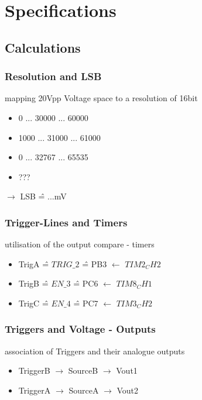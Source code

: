 	\section{Specifications}
	\subsection{Calculations}

	\subsubsection{Resolution and LSB}
	mapping 20Vpp Voltage space to a resolution of 16bit
	\begin{itemize}
		\item 0 ... 30000 ... 60000
		\item 1000 ... 31000 ... 61000
		\item 0 ... 32767 ... 65535
		\item ???
	\end{itemize}
	$\rightarrow$ LSB \^{=} ...mV


	\subsubsection{Trigger-Lines and Timers}
	utilisation of the output compare - timers
	\begin{itemize}
		\item TrigA \^{=} $TRIG\_2$  \^{=} PB3 $\leftarrow$ $TIM2_CH2$
		\item TrigB \^{=} $EN\_3$    \^{=} PC6 $\leftarrow$ $TIM8_CH1$
		\item TrigC \^{=} $EN\_4$    \^{=} PC7 $\leftarrow$ $TIM3_CH2$
	\end{itemize}

	\subsubsection{Triggers and Voltage - Outputs}
	association of Triggers and their analogue outputs
	\begin{itemize}
		\item TriggerB $\rightarrow$ SourceB $\rightarrow$ Vout1
		\item TriggerA $\rightarrow$ SourceA $\rightarrow$ Vout2
	\end{itemize}



